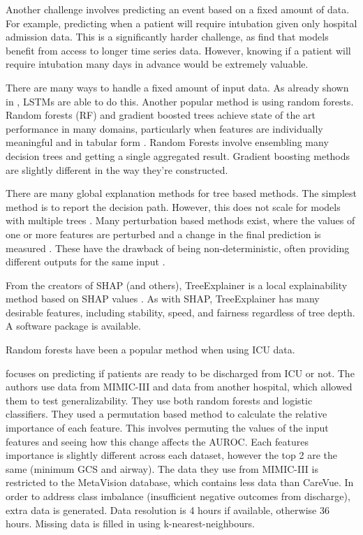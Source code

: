 \documentclass[12pt]{article}
\begin{document}
Another challenge involves predicting an event based on a fixed amount of data. For example, predicting when a patient will require intubation given only hospital admission data. This is a significantly harder challenge, as \cite{KajiLSTM,ICUFancyLSTM} find that models benefit from access to longer time series data. However, knowing if a patient will require intubation many days in advance would be extremely valuable. 

There are many ways to handle a fixed amount of input data. As already shown in \cite{ICUFancyLSTM}, LSTMs are able to do this. Another popular method is using random forests. Random forests (RF) and gradient boosted trees achieve state of the art performance in many domains, particularly when features are individually meaningful and in tabular form \cite{TreeExplainer}. Random Forests involve ensembling many decision trees and getting a single aggregated result. Gradient boosting methods are slightly different in the way they're constructed.

There are many global explanation methods for tree based methods. The simplest method is to report the decision path. However, this does not scale for models with multiple trees \cite{TreeExplainer}. Many perturbation based methods exist, where the values of one or more features are perturbed and a change in the final prediction is measured \cite{TreePerturb}. These have the drawback of being non-deterministic, often providing different outputs for the same input \cite{TreeExplainer}.

From the creators of SHAP (and others), TreeExplainer is a local explainability method based on SHAP values \cite{TreeExplainer}. As with SHAP, TreeExplainer has many desirable features, including stability, speed, and fairness regardless of tree depth. A software package is available.

Random forests have been a popular method when using ICU data.

\cite{MIMIC_BMJ_RF} focuses on predicting if patients are ready to be discharged from ICU or not. The authors use data from MIMIC-III and data from another hospital, which allowed them to test generalizability. They use both random forests and logistic classifiers. They used a permutation based method to calculate the relative importance of each feature. This involves permuting the values of the input features and seeing how this change affects the AUROC. Each features importance is slightly different across each dataset, however the top 2 are the same (minimum GCS and airway). The data they use from MIMIC-III is restricted to the MetaVision database, which contains less data than CareVue. In order to address class imbalance (insufficient negative outcomes from discharge), extra data is generated. Data resolution is 4 hours if available, otherwise 36 hours. Missing data is filled in using k-nearest-neighbours.
\end{document}
